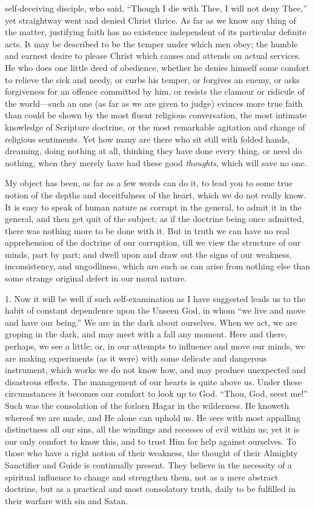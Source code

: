 self-deceiving disciple, who said, ``Though I die
with Thee, I will not deny Thee,'' yet straightway
went and denied Christ thrice. As far as we know any
thing of the matter, justifying faith has no existence
independent of its particular definite acts. It may be
described to be the temper under which men obey; the
humble and earnest desire to please Christ which causes
and attends on actual services. He who does one little
deed of obedience, whether he denies himself some comfort
to relieve the sick and needy, or curbs his temper, or
forgives an enemy, or asks forgiveness for an offence
committed by him, or resists the clamour or ridicule of
the world—such an one (as far as we are given to
judge) evinces more true faith than could be shown by the
most fluent religious conversation, the most intimate
knowledge of Scripture doctrine, or the most remarkable
agitation and change of religious sentiments. Yet how
many are there who sit still with folded hands, dreaming,
doing nothing at all, thinking they have done every
thing, or need do nothing, when they merely have had
these good \emph{thoughts}, which will save no one.

My object has been, as far as a few words can do it,
to lead you to some true notion of the depths and
deceitfulness of the heart, which we do not really know.
It is easy to speak of human nature as corrupt in the
general, to admit it in the general, and then get quit of
the subject; as if the doctrine being once admitted,
there was nothing more to be done with it. But in truth
we can have no real apprehension of the doctrine of our
corruption, till we view the structure of our minds, part
by part; and dwell upon and draw out the signs of our
weakness, inconsistency, and ungodliness, which are such
as can arise from nothing else than some strange original
defect in our moral nature.

1. Now it will be well if such self-examination as I
have suggested leads us to the habit of constant
dependence upon the Unseen God, in whom ``we live and
move and have our being.'' We are in the dark about
ourselves. When we act, we are groping in the dark, and
may meet with a fall any moment. Here and there, perhaps,
we see a little; or, in our attempts to influence and
move our minds, we are making experiments (as it were)
with some delicate and dangerous instrument, which works
we do not know how, and may produce unexpected and
disastrous effects. The management of our hearts is quite
above us. Under these circumstances it becomes our
comfort to look up to God. ``Thou, God, seest
me!'' Such was the consolation of the forlorn Hagar
in the wilderness. He knoweth whereof we are made, and He
alone can uphold us. He sees with most appalling
distinctness all our sins, all the windings and recesses
of evil within us; yet it is our only comfort to know
this, and to trust Him for help against ourselves. To
those who have a right notion of their weakness, the
thought of their Almighty Sanctifier and Guide is
continually present. They believe in the necessity of a
spiritual influence to change and strengthen them, not as
a mere abstract doctrine, but as a practical and most consolatory truth, daily to be fulfilled in their warfare
with sin and Satan.

